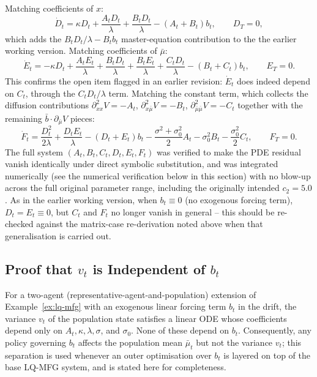Matching coefficients of $x$:
\[
    \dot{D}_t = \kappa D_t + \frac{A_tD_t}{\lambda} + \frac{B_tD_t}{\lambda} -
    (A_t+B_t)b_t, \qquad D_T = 0,
\]
which adds the $B_tD_t/\lambda - B_tb_t$ master-equation contribution to the
the earlier working version. Matching coefficients of $\bar\mu$:
\[
    \dot{E}_t = -\kappa D_t + \frac{A_tE_t}{\lambda} + \frac{B_tD_t}{\lambda} +
    \frac{B_tE_t}{\lambda} + \frac{C_tD_t}{\lambda} - (B_t+C_t)b_t,
    \qquad E_T = 0.
\]
This confirms the open item flagged in an earlier revision: $\dot{E}_t$ does
indeed depend on $C_t$, through the $C_tD_t/\lambda$ term. Matching the
constant term, which collects the diffusion contributions
$\partial^2_{xx}V=-A_t$, $\partial^2_{x\bar\mu}V=-B_t$,
$\partial^2_{\bar\mu\bar\mu}V=-C_t$ together with the remaining
$\bar{b}\cdot\partial_{\bar\mu}V$ pieces:
\[
    \dot{F}_t = \frac{D_t^2}{2\lambda} + \frac{D_tE_t}{\lambda} -
    (D_t+E_t)b_t - \frac{\sigma^2+\sigma_0^2}{2}A_t - \sigma_0^2B_t -
    \frac{\sigma_0^2}{2}C_t, \qquad F_T = 0.
\]
The full system $(A_t,B_t,C_t,D_t,E_t,F_t)$ was verified to make the PDE
residual vanish identically under direct symbolic substitution, and was
integrated numerically (see the numerical verification below in this section) with no blow-up
across the full original parameter range, including the originally intended
$c_2=5.0$. As in the earlier working version, when $b_t\equiv0$ (no exogenous
forcing term), $D_t=E_t\equiv0$, but
$C_t$ and $F_t$ no longer vanish in general -- this should be
re-checked against the matrix-case re-derivation noted above when that
generalisation is carried out.

\subsection{Proof that $v_t$ is Independent of $b_t$}

For a two-agent (representative-agent-and-population) extension of
Example~\ref{ex:lq-mfg} with an exogenous linear forcing term $b_t$ in the drift,
the variance $v_t$ of the population state satisfies a linear ODE whose
coefficients depend only on $A_t, \kappa, \lambda, \sigma$, and $\sigma_0$. None of
these depend on $b_t$. Consequently, any policy governing $b_t$ affects the
population mean $\bar\mu_t$ but not the variance $v_t$; this separation is used
whenever an outer optimisation over $b_t$ is layered on top of the base LQ-MFG
system, and is stated here for completeness.

